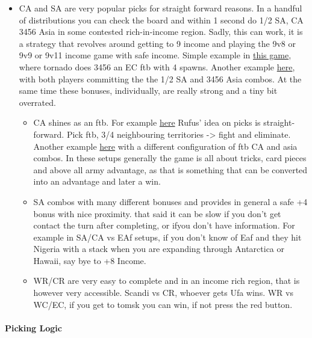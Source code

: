 \begin{enumerate}
\begin{itemize}
\begin{itemize}
        \end{itemize}
        \item CA and SA are very popular picks for straight forward reasons. In a handful of distributions you can check the board and within 1 second do 1/2 SA, CA 3456 Asia in some contested rich-in-income region. Sadly, this can work, it is a strategy that revolves around getting to 9 income and playing the 9v8 or 9v9 or 9v11 income game with safe income. Simple example in \href{https://www.warzone.com/MultiPlayer?GameID=37304447}{this game}, where tornado does 3456 an EC ftb with 4 spawns. Another example \href{https://www.warzone.com/MultiPlayer?GameID=33517812}{here}, with both players committing the the 1/2 SA and 3456 Asia combos. At the same time these bonuses, individually, are really strong and a tiny bit overrated.
        \begin{itemize}
            \item CA shines as an ftb. For example \href{https://www.warzone.com/MultiPlayer?GameID=33091886}{here} Rufus' idea on picks is straight-forward. Pick ftb, 3/4 neighbouring territories -> fight and eliminate. Another example \href{https://www.warzone.com/MultiPlayer?GameID=20536396}{here} with a different configuration of ftb CA and asia combos. In these setups generally the game is all about tricks, card pieces and above all army advantage, as that is something that can be converted into an advantage and later a win.
            \item SA combos with many different bonuses and provides in general a safe +4 bonus with nice proximity. that said it can be slow if you don't get contact the turn after completing, or ifyou don't have information. For example in SA/CA vs EAf setups, if you don't know of Eaf and they hit Nigeria with a stack when you are expanding through Antarctica or Hawaii, say bye to +8 Income.
            \item WR/CR are very easy to complete and in an income rich region, that is however very accessible. Scandi vs CR, whoever gets Ufa wins. WR vs WC/EC, if you get to tomsk you can win, if not press the red button.
        \end{itemize}
        

    \end{itemize}
\end{enumerate}

\paragraph{Picking Logic}

